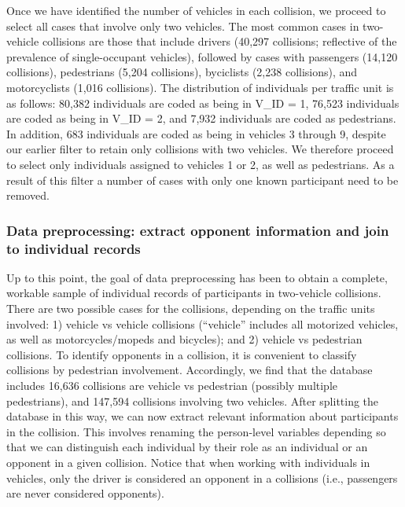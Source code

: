 \documentclass[]{elsarticle} %
\begin{document}
Once we have identified the number of vehicles in each collision, we
proceed to select all cases that involve only two vehicles. The most
common cases in two-vehicle collisions are those that include drivers
(40,297 collisions; reflective of the prevalence of single-occupant
vehicles), followed by cases with passengers (14,120 collisions),
pedestrians (5,204 collisions), byciclists (2,238 collisions), and
motorcyclists (1,016 collisions). The distribution of individuals per
traffic unit is as follows: 80,382 individuals are coded as being in
V\_ID = 1, 76,523 individuals are coded as being in V\_ID = 2, and 7,932
individuals are coded as pedestrians. In addition, 683 individuals are
coded as being in vehicles 3 through 9, despite our earlier filter to
retain only collisions with two vehicles. We therefore proceed to select
only individuals assigned to vehicles 1 or 2, as well as pedestrians. As
a result of this filter a number of cases with only one known
participant need to be removed.

\hypertarget{data-preprocessing-extract-opponent-information-and-join-to-individual-records}{%
\subsubsection{Data preprocessing: extract opponent information and join
to individual
records}\label{data-preprocessing-extract-opponent-information-and-join-to-individual-records}}

Up to this point, the goal of data preprocessing has been to obtain a
complete, workable sample of individual records of participants in
two-vehicle collisions. There are two possible cases for the collisions,
depending on the traffic units involved: 1) vehicle vs vehicle
collisions (``vehicle'' includes all motorized vehicles, as well as
motorcycles/mopeds and bicycles); and 2) vehicle vs pedestrian
collisions. To identify opponents in a collision, it is convenient to
classify collisions by pedestrian involvement. Accordingly, we find that
the database includes 16,636 collisions are vehicle vs pedestrian
(possibly multiple pedestrians), and 147,594 collisions involving two
vehicles. After splitting the database in this way, we can now extract
relevant information about participants in the collision. This involves
renaming the person-level variables depending so that we can distinguish
each individual by their role as an individual or an opponent in a given
collision. Notice that when working with individuals in vehicles, only
the driver is considered an opponent in a collisions (i.e., passengers
are never considered opponents).
\end{document}
